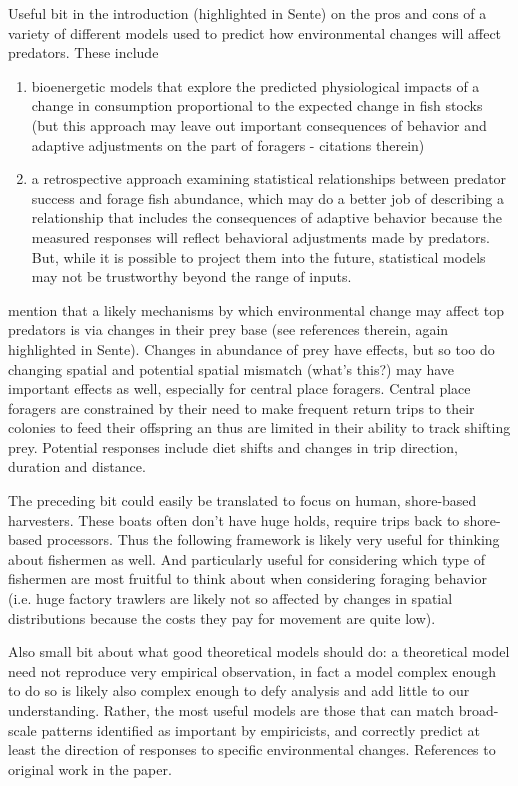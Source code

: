 \documentclass[a4paper,10pt]{report}
\begin{document}
\begin{description}
Useful bit in the introduction (highlighted in Sente) on the pros and cons of a variety of different models used to predict how environmental changes will affect predators. These include
\begin{enumerate}
\item  bioenergetic models that explore the predicted physiological impacts of a change in consumption proportional to the expected change in fish stocks (but this approach may leave out important consequences of behavior and adaptive adjustments on the part of foragers - citations therein)
\item a retrospective approach examining statistical relationships between predator success and forage fish abundance, which may do a better job of describing a relationship that includes the consequences of adaptive behavior because the measured responses will reflect behavioral adjustments made by predators. But, while it is possible to project them into the future, statistical models may not be trustworthy beyond the range of inputs. 
\end{enumerate}
\cite{SatterthwaiteMangel:2012} mention that a likely mechanisms by which environmental change may affect top predators is via changes in their prey base (see references therein, again highlighted in Sente). Changes in abundance of prey have effects, but so too do changing spatial and potential spatial mismatch (what's this?) may have important effects as well, especially for central place foragers. Central place foragers are constrained by their need to make frequent return trips to their colonies to feed their offspring an thus are limited in their ability to track shifting prey. Potential responses include diet shifts and changes in trip direction, duration and distance. 

The preceding bit could easily be translated to focus on human, shore-based harvesters. These boats often don't have huge holds, require trips back to shore-based processors. Thus the following framework is likely very useful for thinking about fishermen as well. And particularly useful for considering which type of fishermen are most fruitful to think about when considering foraging behavior (i.e. huge factory trawlers are likely not so affected by changes in spatial distributions because the costs they pay for movement are quite low). 

Also small bit about what good theoretical models should do: a theoretical model need not reproduce very empirical observation, in fact a model complex enough to do so is likely also complex enough to defy analysis and add little to our understanding. Rather, the most useful models are those that can match broad-scale patterns identified as important by empiricists, and correctly predict at least the direction of responses to specific environmental changes. References to original work in the paper. 


\end{description}
\end{document}
